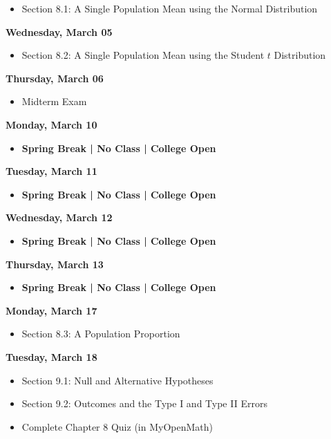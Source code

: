 \documentclass[11pt]{article}
\begin{document}
\begin{itemize}
\item Section 8.1: A Single Population Mean using the Normal Distribution
\end{itemize}

\textbf{Wednesday, March 05}

\begin{itemize}
\item Section 8.2: A Single Population Mean using the Student $t$ Distribution
\end{itemize}

\textbf{Thursday, March 06}

\begin{itemize}
\item Midterm Exam
\end{itemize}

\textbf{Monday, March 10}

\begin{itemize}
\item \textbf{Spring Break | No Class | College Open}
\end{itemize}

\textbf{Tuesday, March 11}

\begin{itemize}
\item \textbf{Spring Break | No Class | College Open}
\end{itemize}

\textbf{Wednesday, March 12}

\begin{itemize}
\item \textbf{Spring Break | No Class | College Open}
\end{itemize}

\textbf{Thursday, March 13}

\begin{itemize}
\item \textbf{Spring Break | No Class | College Open}
\end{itemize}

\textbf{Monday, March 17}

\begin{itemize}
\item Section 8.3: A Population Proportion
\end{itemize}

\textbf{Tuesday, March 18}

\begin{itemize}
\item Section 9.1: Null and Alternative Hypotheses
\item Section 9.2: Outcomes and the Type I and Type II Errors
\item Complete Chapter 8 Quiz (in MyOpenMath)
\end{itemize}
\end{document}
